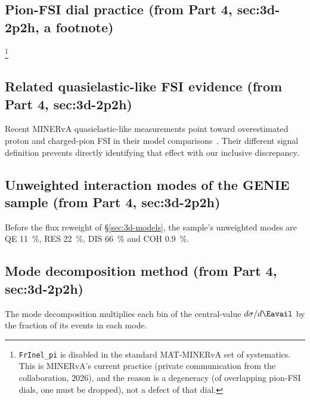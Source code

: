 \subsection{Pion-FSI dial practice (from Part 4, sec:3d-2p2h, a footnote)}
 \footnote{\texttt{FrInel\_pi} is disabled in the standard MAT-MINERvA set of systematics. This is MINERvA's current practice (private communication from the collaboration, 2026), and the reason is a degeneracy (of overlapping pion-FSI dials, one must be dropped), not a defect of that dial.}

\subsection{Related quasielastic-like FSI evidence (from Part 4, sec:3d-2p2h)}
 Recent MINERvA quasielastic-like measurements point toward overestimated proton and charged-pion FSI in their model comparisons~\cite{MINERvA:2026qeleme}. Their different signal definition prevents directly identifying that effect with our inclusive discrepancy.

\subsection{Unweighted interaction modes of the GENIE sample (from Part 4, sec:3d-2p2h)}
Before the flux reweight of \S\ref{sec:3d-models}, the sample's unweighted modes are QE \SI{11}{\percent}, RES \SI{22}{\percent}, DIS \SI{66}{\percent} and COH \SI{0.9}{\percent}.

\subsection{Mode decomposition method (from Part 4, sec:3d-2p2h)}
 The mode decomposition multiplies each bin of the central-value $d\sigma/d\Eavail$ by the fraction of its events in each mode.

